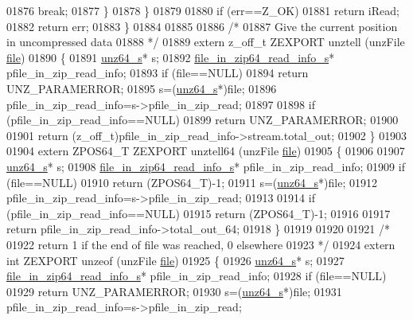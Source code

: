 \begin{DoxyCode}
01876                 \textcolor{keywordflow}{break};
01877         \}
01878     \}
01879 
01880     \textcolor{keywordflow}{if} (err==Z\_OK)
01881         \textcolor{keywordflow}{return} iRead;
01882     \textcolor{keywordflow}{return} err;
01883 \}
01884 
01885 
01886 \textcolor{comment}{/*}
01887 \textcolor{comment}{  Give the current position in uncompressed data}
01888 \textcolor{comment}{*/}
01889 \textcolor{keyword}{extern} z\_off\_t ZEXPORT unztell (unzFile \hyperlink{structfile}{file})
01890 \{
01891     \hyperlink{structunz64__s}{unz64\_s}* s;
01892     \hyperlink{structfile__in__zip64__read__info__s}{file\_in\_zip64\_read\_info\_s}* pfile\_in\_zip\_read\_info;
01893     \textcolor{keywordflow}{if} (file==NULL)
01894         \textcolor{keywordflow}{return} UNZ\_PARAMERROR;
01895     s=(\hyperlink{structunz64__s}{unz64\_s}*)file;
01896     pfile\_in\_zip\_read\_info=s->pfile\_in\_zip\_read;
01897 
01898     \textcolor{keywordflow}{if} (pfile\_in\_zip\_read\_info==NULL)
01899         \textcolor{keywordflow}{return} UNZ\_PARAMERROR;
01900 
01901     \textcolor{keywordflow}{return} (z\_off\_t)pfile\_in\_zip\_read\_info->stream.total\_out;
01902 \}
01903 
01904 \textcolor{keyword}{extern} ZPOS64\_T ZEXPORT unztell64 (unzFile \hyperlink{structfile}{file})
01905 \{
01906 
01907     \hyperlink{structunz64__s}{unz64\_s}* s;
01908     \hyperlink{structfile__in__zip64__read__info__s}{file\_in\_zip64\_read\_info\_s}* pfile\_in\_zip\_read\_info;
01909     \textcolor{keywordflow}{if} (file==NULL)
01910         \textcolor{keywordflow}{return} (ZPOS64\_T)-1;
01911     s=(\hyperlink{structunz64__s}{unz64\_s}*)file;
01912     pfile\_in\_zip\_read\_info=s->pfile\_in\_zip\_read;
01913 
01914     \textcolor{keywordflow}{if} (pfile\_in\_zip\_read\_info==NULL)
01915         \textcolor{keywordflow}{return} (ZPOS64\_T)-1;
01916 
01917     \textcolor{keywordflow}{return} pfile\_in\_zip\_read\_info->total\_out\_64;
01918 \}
01919 
01920 
01921 \textcolor{comment}{/*}
01922 \textcolor{comment}{  return 1 if the end of file was reached, 0 elsewhere}
01923 \textcolor{comment}{*/}
01924 \textcolor{keyword}{extern} \textcolor{keywordtype}{int} ZEXPORT unzeof (unzFile \hyperlink{structfile}{file})
01925 \{
01926     \hyperlink{structunz64__s}{unz64\_s}* s;
01927     \hyperlink{structfile__in__zip64__read__info__s}{file\_in\_zip64\_read\_info\_s}* pfile\_in\_zip\_read\_info;
01928     \textcolor{keywordflow}{if} (file==NULL)
01929         \textcolor{keywordflow}{return} UNZ\_PARAMERROR;
01930     s=(\hyperlink{structunz64__s}{unz64\_s}*)file;
01931     pfile\_in\_zip\_read\_info=s->pfile\_in\_zip\_read;

\end{DoxyCode}
